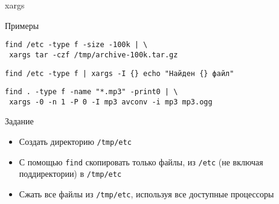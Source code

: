 \begin{frame}[fragile]{xargs}
	\begin{block}{Примеры}
		\begin{verbatim}
find /etc -type f -size -100k | \
 xargs tar -czf /tmp/archive-100k.tar.gz
		\end{verbatim}

		\begin{verbatim}
find /etc -type f | xargs -I {} echo "Найден {} файл"
		\end{verbatim}

		\begin{verbatim}
find . -type f -name "*.mp3" -print0 | \
 xargs -0 -n 1 -P 0 -I mp3 avconv -i mp3 mp3.ogg
		\end{verbatim}
	
	\end{block}
\end{frame}

\begin{frame}[fragile]{Задание}
	\begin{itemize}
		\item Создать директорию {\tt /tmp/etc}
		\item С помощью {\tt find} скопировать только файлы,
		      из {\tt /etc} (не включая поддиректории) в {\tt /tmp/etc}
		\item Сжать все файлы из {\tt /tmp/etc}, используя все доступные процессоры
	\end{itemize}
\end{frame}


